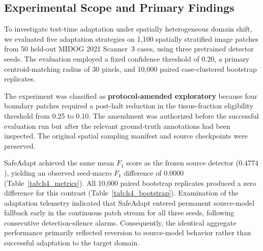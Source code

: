 \documentclass[conference]{IEEEtran}
\begin{document}
\subsection{Experimental Scope and Primary Findings}
To investigate test-time adaptation under spatially heterogeneous domain shift, we evaluated five adaptation strategies on 1,100 spatially stratified image patches from 50 held-out MIDOG 2021 Scanner~3 cases, using three pretrained detector seeds.
The evaluation employed a fixed confidence threshold of 0.20, a primary centroid-matching radius of 30 pixels, and 10,000 paired case-clustered bootstrap replicates.

The experiment was classified as \textbf{protocol-amended exploratory} because four boundary patches required a post-halt reduction in the tissue-fraction eligibility threshold from 0.25 to 0.10.
The amendment was authorized before the successful evaluation run but after the relevant ground-truth annotations had been inspected.
The original spatial sampling manifest and source checkpoints were preserved.

SafeAdapt achieved the same mean $F_1$ score as the frozen source detector ($0.4774$), yielding an observed seed-macro $F_1$ difference of $0.0000$ (Table~\ref{tab:h4_metrics}).
All 10,000 paired bootstrap replicates produced a zero difference for this contrast (Table~\ref{tab:h4_bootstrap}).
Examination of the adaptation telemetry indicated that SafeAdapt entered permanent source-model fallback early in the continuous patch stream for all three seeds, following consecutive detection-silence alarms.
Consequently, the identical aggregate performance primarily reflected reversion to source-model behavior rather than successful adaptation to the target domain.
\end{document}
